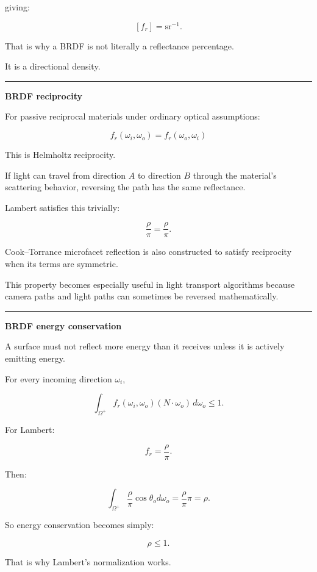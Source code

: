 giving:

\[
\boxed{
[f_r]=\mathrm{sr}^{-1}.
}
\]

That is why a BRDF is not literally a reflectance percentage.

It is a directional density.

\begin{center}\rule{0.5\linewidth}{0.5pt}\end{center}

\textbf{BRDF reciprocity}

For passive reciprocal materials under ordinary optical assumptions:

\[
\boxed{
f_r(\omega_i,\omega_o)
=
f_r(\omega_o,\omega_i)
}
\]

This is Helmholtz reciprocity.

If light can travel from direction \(A\) to direction \(B\) through the material's scattering behavior, reversing the path has the same reflectance.

Lambert satisfies this trivially:

\[
\frac{\rho}{\pi}
=
\frac{\rho}{\pi}.
\]

Cook--Torrance microfacet reflection is also constructed to satisfy reciprocity when its terms are symmetric.

This property becomes especially useful in light transport algorithms because camera paths and light paths can sometimes be reversed mathematically.

\begin{center}\rule{0.5\linewidth}{0.5pt}\end{center}

\textbf{BRDF energy conservation}

A surface must not reflect more energy than it receives unless it is actively emitting energy.

For every incoming direction \(\omega_i\),

\[
\boxed{
\int_{\Omega^+}
f_r(\omega_i,\omega_o)
(N\cdot\omega_o)
\,d\omega_o
\le1.
}
\]

For Lambert:

\[
f_r=\frac{\rho}{\pi}.
\]

Then:

\[
\int_{\Omega^+}
\frac{\rho}{\pi}
\cos\theta_o
d\omega_o
=
\frac{\rho}{\pi}\pi
=
\rho.
\]

So energy conservation becomes simply:

\[
\rho\le1.
\]

That is why Lambert's normalization works.

